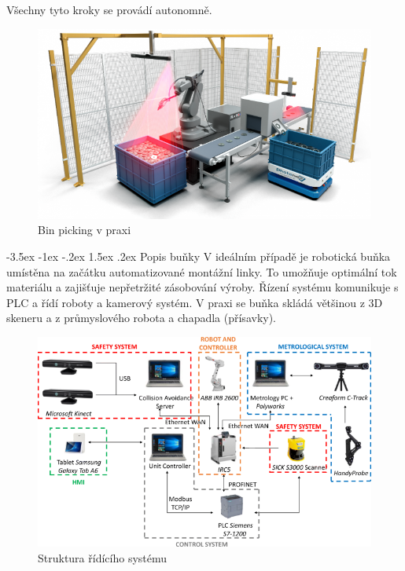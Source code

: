 \documentclass[a4paper,11pt]{article}
\makeatletter
\theoremstyle{definition}
\renewcommand\section{\@startsection {section}{1}{\z@}%
                                   {-3.5ex \@plus -1ex \@minus -.2ex}%
                                   {1.5ex \@plus.2ex}%
                                   {\large\bfseries}}
\makeatother
\begin{document}
Všechny tyto kroky se provádí autonomně. 
\cite{atria,8123228} 

\begin{figure}[h]
\begin{center}
\includegraphics[scale=0.5]{image/binpicking.png}
\caption{Bin picking v praxi \cite{sodavision}}
\label{fig:1}
\end{center}
\end{figure}
\newpage
\section{Popis buňky}
\label{sec:2}
V ideálním případě je robotická buňka umístěna na začátku automatizované montážní linky. To umožňuje optimální tok materiálu a zajišťuje nepřetržité zásobování výroby. Řízení systému komunikuje s PLC a řídí roboty a kamerový systém. V praxi se buňka skládá většinou z 3D skeneru a z průmyslového robota a chapadla (přísavky). 
\begin{figure}[h]
\begin{center}
\includegraphics[scale=0.5]{image/descriptionbinpickingcell.png}
\caption{Struktura řídícího systému}
\label{fig:2}
\end{center}
\end{figure}
\end{document}
